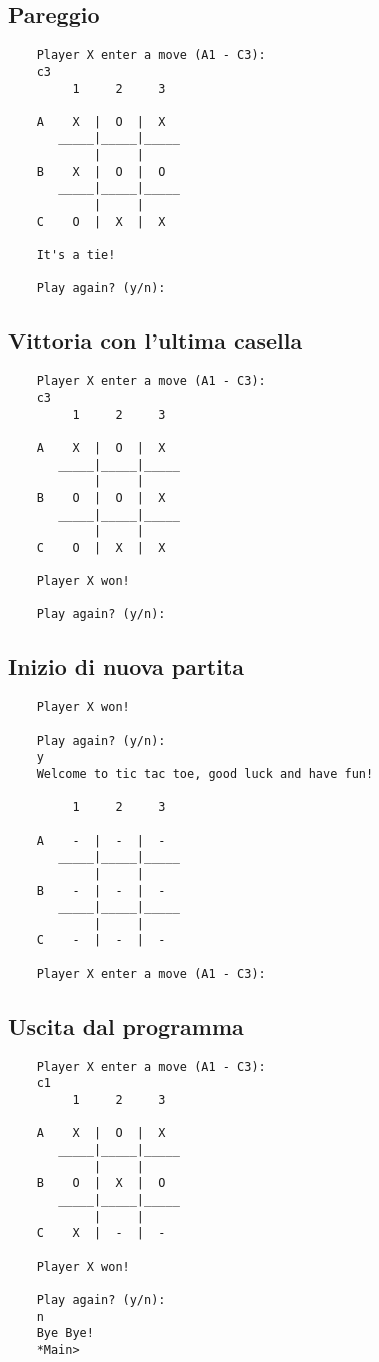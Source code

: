 \documentclass{article}
\begin{document}
\subsection{Pareggio}
    \begin{verbatim}
    Player X enter a move (A1 - C3): 
    c3
         1     2     3

    A    X  |  O  |  X  
       _____|_____|_____
            |     |     
    B    X  |  O  |  O  
       _____|_____|_____
            |     |     
    C    O  |  X  |  X  

    It's a tie!

    Play again? (y/n):
    \end{verbatim}

\subsection{Vittoria con l'ultima casella}
    \begin{verbatim}
    Player X enter a move (A1 - C3): 
    c3
         1     2     3

    A    X  |  O  |  X  
       _____|_____|_____
            |     |     
    B    O  |  O  |  X  
       _____|_____|_____
            |     |     
    C    O  |  X  |  X  

    Player X won!

    Play again? (y/n):
    \end{verbatim}

\subsection{Inizio di nuova partita}
    \begin{verbatim}
    Player X won!

    Play again? (y/n):
    y
    Welcome to tic tac toe, good luck and have fun!

         1     2     3

    A    -  |  -  |  -  
       _____|_____|_____
            |     |     
    B    -  |  -  |  -  
       _____|_____|_____
            |     |     
    C    -  |  -  |  -  

    Player X enter a move (A1 - C3): 
    \end{verbatim}

\subsection{Uscita dal programma}
    \begin{verbatim}
    Player X enter a move (A1 - C3): 
    c1
         1     2     3

    A    X  |  O  |  X  
       _____|_____|_____
            |     |     
    B    O  |  X  |  O  
       _____|_____|_____
            |     |     
    C    X  |  -  |  -  

    Player X won!

    Play again? (y/n):
    n
    Bye Bye!
    *Main> 
    \end{verbatim}
\newpage
\end{document}
